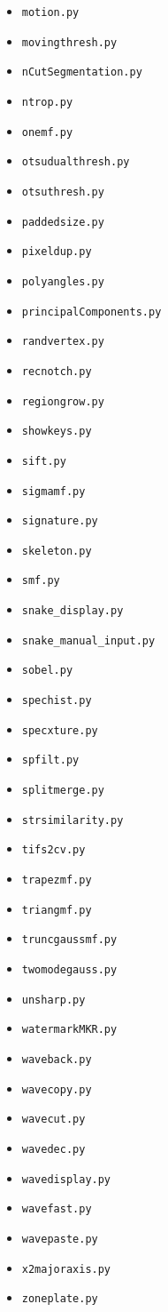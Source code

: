 \documentclass[11pt]{article}
\begin{document}
\begin{itemize}[leftmargin=1.5em]
\item \texttt{motion.py}
\item \texttt{movingthresh.py}
\item \texttt{nCutSegmentation.py}
\item \texttt{ntrop.py}
\item \texttt{onemf.py}
\item \texttt{otsudualthresh.py}
\item \texttt{otsuthresh.py}
\item \texttt{paddedsize.py}
\item \texttt{pixeldup.py}
\item \texttt{polyangles.py}
\item \texttt{principalComponents.py}
\item \texttt{randvertex.py}
\item \texttt{recnotch.py}
\item \texttt{regiongrow.py}
\item \texttt{showkeys.py}
\item \texttt{sift.py}
\item \texttt{sigmamf.py}
\item \texttt{signature.py}
\item \texttt{skeleton.py}
\item \texttt{smf.py}
\item \texttt{snake\_display.py}
\item \texttt{snake\_manual\_input.py}
\item \texttt{sobel.py}
\item \texttt{spechist.py}
\item \texttt{specxture.py}
\item \texttt{spfilt.py}
\item \texttt{splitmerge.py}
\item \texttt{strsimilarity.py}
\item \texttt{tifs2cv.py}
\item \texttt{trapezmf.py}
\item \texttt{triangmf.py}
\item \texttt{truncgaussmf.py}
\item \texttt{twomodegauss.py}
\item \texttt{unsharp.py}
\item \texttt{watermarkMKR.py}
\item \texttt{waveback.py}
\item \texttt{wavecopy.py}
\item \texttt{wavecut.py}
\item \texttt{wavedec.py}
\item \texttt{wavedisplay.py}
\item \texttt{wavefast.py}
\item \texttt{wavepaste.py}
\item \texttt{x2majoraxis.py}
\item \texttt{zoneplate.py}
\end{itemize}
\end{document}
